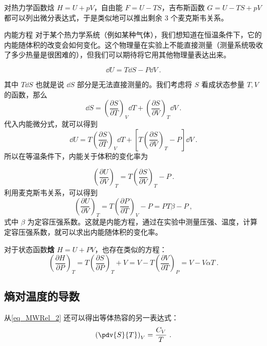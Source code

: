 对热力学函数焓 $H=U+pV$，自由能 $F=U-TS$，吉布斯函数 $G=U-TS+pV$ 都可以列出微分表达式，于是类似地可以推出剩余 $3$ 个麦克斯韦关系。

\begin{example}{内能方程}
对于某个热力学系统（例如某种气体），我们想知道在恒温条件下，它的内能随体积的改变会如何变化。这个物理量在实验上不能直接测量（测量系统吸收了多少热量是很困难的），但我们可以期待将它用其他物理量表达出来。

\begin{equation}
\dd U=T\dd S-P\dd V~.
\end{equation}

其中 $T\dd S$ 也就是说 $\dd S$ 部分是无法直接测量的。我们考虑将 $S$ 看成状态参量 $T,V$ 的函数，那么 
\begin{equation}
\dd S=\left(\frac{\partial S}{\partial T}\right)_V \dd T+\left(\frac{\partial S}{\partial V}\right)_T \dd V~.
\end{equation}
代入内能微分式，就可以得到
\begin{equation}\label{eq_MWRel_2}
\dd U=T\left(\frac{\partial S}{\partial T}\right)_V\dd T+\left[T\left(\frac{\partial S}{\partial V}\right)_T-P\right]\dd V~.
\end{equation}
所以在等温条件下，内能关于体积的变化率为

\begin{equation}
\left(\frac{\partial U}{\partial V}\right)_T=T\left(\frac{\partial S}{\partial V}\right)_T-P~.
\end{equation}
利用麦克斯韦关系，可以得到
\begin{equation}
\left(\frac{\partial U}{\partial V}\right)_T=T\left(\frac{\partial P}{\partial T}\right)_V-P=PT\beta-P~,
\end{equation}
式中 $\beta$ 为定容压强系数。这就是内能方程，通过在实验中测量压强、温度，计算定容压强系数，就可以求出内能随体积的变化率。

对于状态函数\textbf{焓} $H=U+PV$，也存在类似的方程：
\begin{equation}\label{eq_MWRel_3}
\left(\frac{\partial H}{\partial P}\right)_T=T\left(\frac{\partial S}{\partial P}\right)_T+V
=V-T\left(\frac{\partial V}{\partial T}\right)_P=V-V\alpha T~.
\end{equation}

\end{example}

\subsection{熵对温度的导数}
从\autoref{eq_MWRel_2} 还可以得出等体热容的另一表达式：
\begin{equation}
\left(\pdv{S}{T}\right)_V=\frac{C_V}{T}~.
\end{equation}

